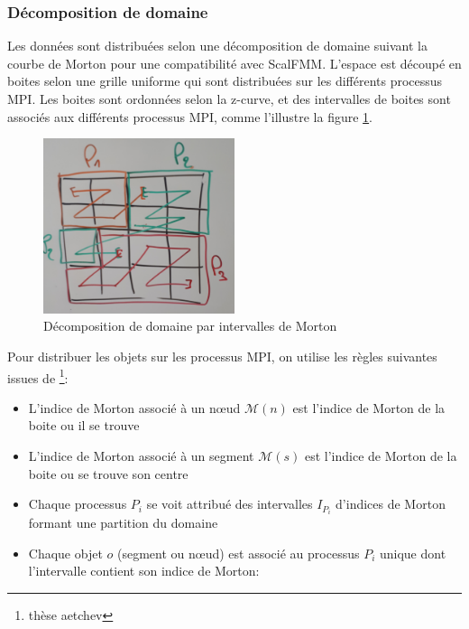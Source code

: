 \subsubsection{Décomposition de domaine}

Les données sont distribuées selon une décomposition de domaine suivant la courbe de Morton pour une compatibilité avec ScalFMM. L'espace est découpé en boites selon une grille uniforme qui sont distribuées sur les différents processus MPI. Les boites sont ordonnées selon la z-curve, et des intervalles de boites sont associés aux différents processus MPI, comme l'illustre la figure \ref{fig:domaindecomposition_morton_interval}.

\begin{figure}[]
    \centering
    \includegraphics[width=0.5\textwidth]{img/domaindecomposition_morton_interval}
    \caption{Décomposition de domaine par intervalles de Morton}
    \label{fig:domaindecomposition_morton_interval}
\end{figure}

Pour distribuer les objets sur les processus MPI, on utilise les règles suivantes issues de \footnote{thèse aetchev}:
\begin{itemize}
    \item L'indice de Morton associé à un nœud $\mathcal{M}(n)$ est l'indice de Morton de la boite ou il se trouve
    \item L'indice de Morton associé à un segment $\mathcal{M}(s)$ est l'indice de Morton de la boite ou se trouve son centre
    \item Chaque processus $P_i$ se voit attribué des intervalles $I_{P_i}$ d'indices de Morton formant une partition du domaine
    \item Chaque objet $o$ (segment ou nœud) est associé au processus $P_i$ unique dont l'intervalle contient son indice de Morton:
\end{itemize}

